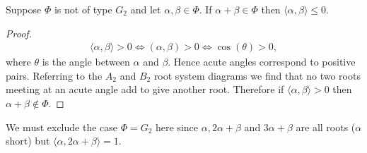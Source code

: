 \begin{lemma} \label{ufixes} Suppose $\Phi$ is not of type $G_2$ and let $\alpha,\beta\in\Phi$. If $\alpha + \beta \in \Phi$ then $\langle \alpha, \beta \rangle \leq 0$.
\end{lemma}
\begin{proof}
\begin{eqnarray*}
\langle \alpha, \beta \rangle > 0 \Longleftrightarrow (\alpha, \beta) >0 \Longleftrightarrow \cos(\theta) > 0,
\end{eqnarray*}
where $\theta$ is the angle between $\alpha$ and $\beta$. Hence acute angles correspond to positive pairs. Referring to the $A_2$ and $B_2$ root system diagrams we find that no two roots meeting at an acute angle add to give another root. Therefore if $\langle \alpha, \beta \rangle > 0$ then $\alpha + \beta \notin \Phi$.
\end{proof}

We must exclude the case $\Phi = G_2$ here since $\alpha, 2\alpha + \beta$ and $3\alpha + \beta$ are all roots ($\alpha$ short) but $\langle \alpha, 2\alpha + \beta \rangle = 1$. %

